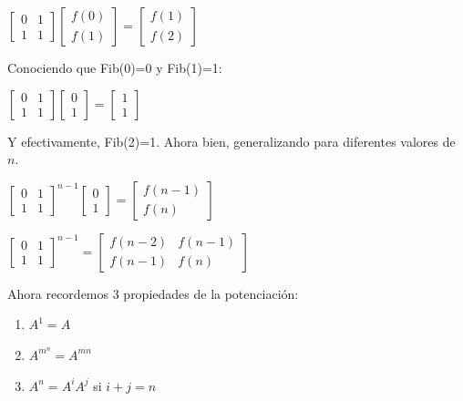$
\begin{bmatrix}
	0 & 1 \\ 
	1 & 1
\end{bmatrix}
\begin{bmatrix}
	f(0)  \\ 
	f(1)
\end{bmatrix}
=
\begin{bmatrix}
	f(1)  \\ 
	f(2)
\end{bmatrix} 
$


Conociendo que Fib(0)=0 y Fib(1)=1:


$
\begin{bmatrix}
	0 & 1 \\ 
	1 & 1
\end{bmatrix}
\begin{bmatrix}
	0  \\ 
	1
\end{bmatrix}
=
\begin{bmatrix}
	1  \\ 
	1
\end{bmatrix} 
$


Y efectivamente, Fib(2)=1. Ahora bien, generalizando para diferentes valores de $n$.


$
\begin{bmatrix}
	0 & 1 \\ 
	1 & 1
\end{bmatrix}
^{n-1}
\begin{bmatrix}
	0  \\ 
	1
\end{bmatrix}
=
\begin{bmatrix}
	f(n-1) \\ 
	f(n)
\end{bmatrix} 
$

$
\begin{bmatrix}
	0 & 1 \\ 
	1 & 1
\end{bmatrix}
^{n-1}
=
\begin{bmatrix}
	f(n-2) & f(n-1) \\ 
	f(n-1) & f(n)
\end{bmatrix} 
$



Ahora recordemos 3 propiedades de la potenciación:

\begin{enumerate}
	\item $A^{1}=A$
	\item $A^{m^{n}}=A^{mn}$ 
	\item $A^{n}=A^{i}A^{j}$ si $i+j=n$
\end{enumerate}


